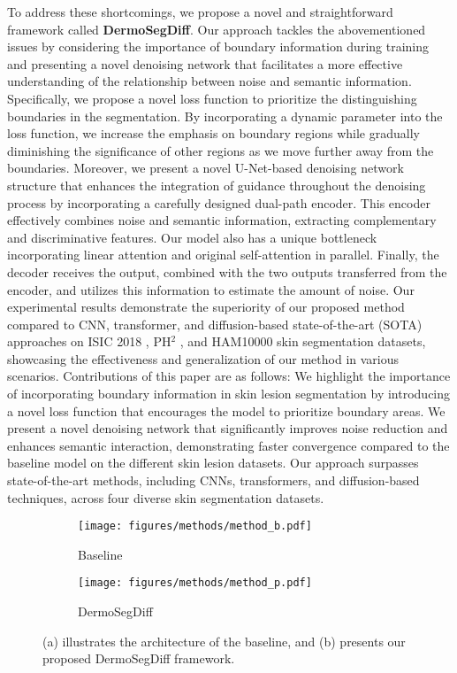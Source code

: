 \documentclass[runningheads]{llncs}
\begin{document}
To address these shortcomings, we propose a novel and straightforward framework called \textbf{DermoSegDiff}. Our approach tackles the abovementioned issues by considering the importance of boundary information during training and presenting a novel denoising network that facilitates a more effective understanding of the relationship between noise and semantic information. Specifically, we propose a novel loss function to prioritize the distinguishing boundaries in the segmentation. By incorporating a dynamic parameter into the loss function, we increase the emphasis on boundary regions while gradually diminishing the significance of other regions as we move further away from the boundaries. Moreover, we present a novel U-Net-based denoising network structure that enhances the integration of guidance throughout the denoising process by incorporating a carefully designed dual-path encoder. This encoder effectively combines noise and semantic information, extracting complementary and discriminative features. Our model also has a unique bottleneck incorporating linear attention \cite{shen2021efficient} and original self-attention \cite{dosovitskiy2020image} in parallel. Finally, the decoder receives the output, combined with the two outputs transferred from the encoder, and utilizes this information to estimate the amount of noise. Our experimental results demonstrate the superiority of our proposed method compared to CNN, transformer, and diffusion-based state-of-the-art (SOTA) approaches on ISIC 2018 \cite{codella2019skin}, PH$^2$ \cite{mendoncca2013ph}, and HAM10000 \cite{tschandl2018ham10000} skin segmentation datasets, showcasing the effectiveness and generalization of our method in various scenarios. Contributions of this paper are as follows:  We highlight the importance of incorporating boundary information in skin lesion segmentation by introducing a novel loss function that encourages the model to prioritize boundary areas.  We present a novel denoising network that significantly improves noise reduction and enhances semantic interaction, demonstrating faster convergence compared to the baseline model on the different skin lesion datasets.  Our approach surpasses state-of-the-art methods, including CNNs, transformers, and diffusion-based techniques, across four diverse skin segmentation datasets.


\begin{figure*}[!t]
	\centering
	\begin{subfigure}{0.48\textwidth}
\texttt{[image: figures/methods/method\_b.pdf]}
		\caption{Baseline}
		\label{fig:baseline}
	\end{subfigure} \hfill
	\begin{subfigure}{0.48\textwidth}
\texttt{[image: figures/methods/method\_p.pdf]}
		\caption{DermoSegDiff}
		\label{fig:pipeline}
	\end{subfigure}
	\caption{(a) illustrates the architecture of the baseline, and (b) presents our proposed DermoSegDiff framework.}
 \label{fig:method}
\end{figure*}
\end{document}
